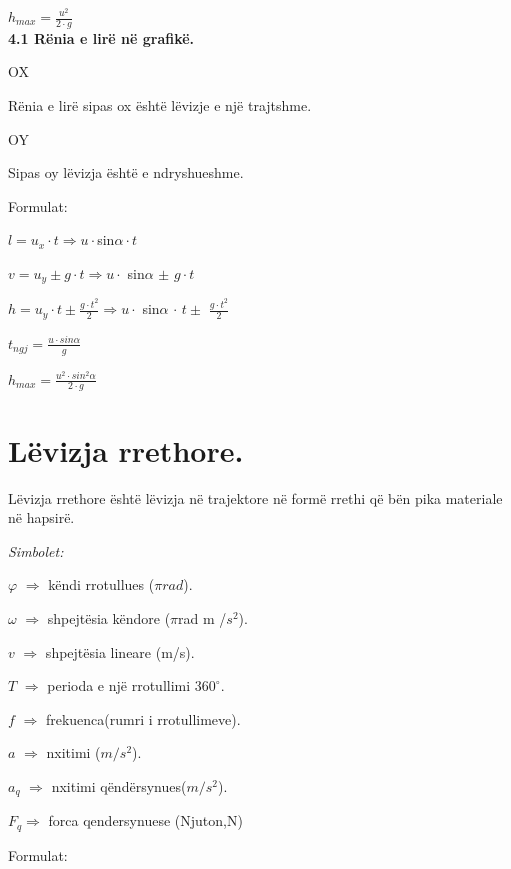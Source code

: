\documentclass[twocolumn]{article}
\begin{document}
	$h_{max}=\frac{u^2}{2 \cdot g}$\\
	
	
	\textbf{4.1 Rënia e lirë në grafikë.}
	
	
	\begin{center}
		OX
	\end{center}
	Rënia e lirë sipas ox është lëvizje e një trajtshme.
	\begin{center}
		OY
	\end{center}
	Sipas oy lëvizja është e ndryshueshme.
	
	\begin{center}
		Formulat:
	\end{center}
	
	$l=u_x \cdot t \Rightarrow u \cdot $sin$\alpha \cdot t$
	
	$v=u_y \pm g \cdot t \Rightarrow u \cdot$ sin$\alpha$ $\pm$ $ g \cdot t$
	
	$h=u_y \cdot t \pm \frac{g \cdot t^2}{2} \Rightarrow u \cdot $ sin$\alpha$ $\cdot$ $t \pm$ $\frac{g \cdot t^2}{2}$
	
	$t_{ngj}=\frac{u \cdot sin\alpha}{g}$
	
	$h_{max}=\frac{u^2 \cdot sin^2\alpha}{2\cdot g}$
	
	
	
	
	
	\section{Lëvizja rrethore.}
	Lëvizja rrethore është lëvizja në trajektore në formë rrethi që bën pika materiale në hapsirë.
	\begin{center}
		\textit{Simbolet:}
	\end{center}
	
	$\varphi$ $\Rightarrow$ këndi rrotullues ($\pi rad$).
	
	$\omega$ $\Rightarrow$ shpejtësia këndore ($\pi$rad m /$s^2$).
	
	$v$ $\Rightarrow$ shpejtësia lineare (m/s).
	
	$T$ $\Rightarrow$ perioda e një rrotullimi $360^\circ$.
	
	$f$ $\Rightarrow$ frekuenca(rumri i rrotullimeve).
	
	$a$ $\Rightarrow$ nxitimi ($m/s^2$).
	
	$a_q$ $\Rightarrow$ nxitimi qëndërsynues($m/s^2$).
	
	$F_q \Rightarrow$ forca qendersynuese (Njuton,N)
	
	
	\begin{center}
		Formulat:
	\end{center}
	
\end{document}
